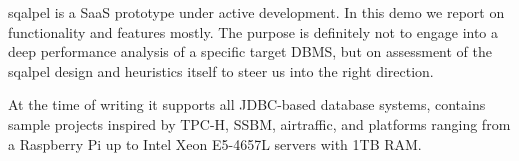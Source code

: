\documentclass{cidr-2019}
\begin{document}
 
 
 
{\sc sqalpel} is a SaaS prototype under active
development. In this demo we
report on functionality and features mostly. The purpose is definitely
not to engage into a deep performance analysis of a specific target
DBMS, but on assessment of the {\sc sqalpel} design and heuristics
itself to steer us into the right direction.

At the time of writing it supports all JDBC-based database systems,
contains sample projects inspired by TPC-H, SSBM, airtraffic, and
platforms ranging from a Raspberry Pi up to Intel Xeon E5-4657L
servers with 1TB RAM.
\end{document}
